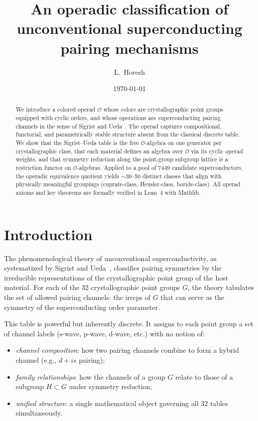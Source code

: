 \documentclass[11pt,a4paper]{article}
\title{An operadic classification of unconventional superconducting
       pairing mechanisms}
\author{L.\ Horesh}
\date{\today}
\newcommand{\OO}{\mathcal{O}}
\begin{document}
\maketitle

\begin{abstract}
We introduce a colored operad $\OO$ whose colors are crystallographic
point groups equipped with cyclic orders, and whose operations are
superconducting pairing channels in the sense of Sigrist and
Ueda~\cite{sigrist1991}. The operad captures compositional,
functorial, and parametrically stable structure absent from the
classical discrete table. We show that the Sigrist--Ueda table is the
free $\OO$-algebra on one generator per crystallographic class, that
each material defines an algebra over $\OO$ via its cyclic operad
weights, and that symmetry reduction along the point-group subgroup
lattice is a restriction functor on $\OO$-algebras. Applied to a pool
of 7449 candidate superconductors, the operadic equivalence quotient
yields $\sim$30--50 distinct classes that align with physically
meaningful groupings (cuprate-class, Heusler-class, boride-class).
All operad axioms and key theorems are formally verified in Lean~4
with Mathlib.
\end{abstract}

\section{Introduction}\label{sec:intro}

The phenomenological theory of unconventional superconductivity, as
systematized by Sigrist and Ueda~\cite{sigrist1991}, classifies
pairing symmetries by the irreducible representations of the
crystallographic point group of the host material. For each of the 32
crystallographic point groups $G$, the theory tabulates the set of
allowed pairing channels: the irreps of $G$ that can serve as the
symmetry of the superconducting order parameter.

This table is powerful but inherently discrete. It assigns to each
point group a set of channel labels (s-wave, p-wave, d-wave, etc.)
with no notion of:
\begin{itemize}
  \item \emph{channel composition}: how two pairing channels combine
        to form a hybrid channel (e.g., $d + is$ pairing);
  \item \emph{family relationships}: how the channels of a group $G$
        relate to those of a subgroup $H \subset G$ under symmetry
        reduction;
  \item \emph{unified structure}: a single mathematical object
        governing all 32 tables simultaneously.
\end{itemize}
\end{document}
